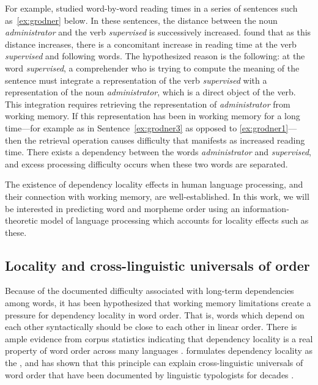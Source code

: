 For example, \citet{grodner-consequences-2005} studied word-by-word reading times in a series of sentences such as~\ref{ex:grodner} below. 
In these sentences, the distance between the noun \emph{administrator} and the verb \emph{supervised} is successively increased. \citet{grodner-consequences-2005} found that as this distance increases, there is a concomitant increase in reading time at the verb \emph{supervised} and following words. The hypothesized reason is the following: at the word \emph{supervised}, a comprehender who is trying to compute the meaning of the sentence must integrate a representation of the verb \emph{supervised} with a representation of the noun \emph{administrator}, which is a direct object of the verb. This integration requires retrieving the representation of \emph{administrator} from working memory. If this representation has been in working memory for a long time---for example as in Sentence~\ref{ex:grodner3} as opposed to \ref{ex:grodner1}---then the retrieval operation causes difficulty that manifests as increased reading time. There exists a dependency between the words \emph{administrator} and \emph{supervised}, and excess processing difficulty occurs when these two words are separated. 

The existence of dependency locality effects in human language processing, and their connection with working memory, are well-established. In this work, we will be interested in predicting word and morpheme order using an information-theoretic model of language processing which accounts for locality effects such as these. 

\subsection{Locality and cross-linguistic universals of order}

Because of the documented difficulty associated with long-term dependencies among words, it has been hypothesized that working memory limitations create a pressure for dependency locality in word order. 
That is, words which depend on each other syntactically should be close to each other in linear order.
There is ample evidence from corpus statistics indicating that dependency locality is a real property of word order across many languages \citep{gildea-optimizing-2007,liu2008dependency,gildea-grammars-2010,futrell-large-scale-2015,liu-dependency-2017,temperley-minimizing-2018}. 
\citet{hawkins-performance-1994,hawkins-efficiency-2003} formulates dependency locality as the , and has shown that this principle can explain cross-linguistic universals of word order that have been documented by linguistic typologists for decades \citep{greenberg-universals-1963}. 

